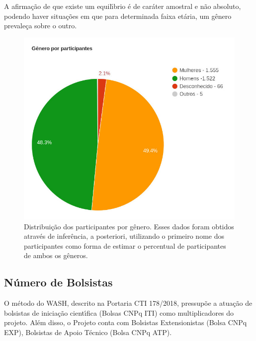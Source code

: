 \documentclass[
12pt,		%
openright,	%
twoside,  %
a4paper,			%
chapter=TITLE,		%
english,			%
french,				%
spanish,			%
brazil				%
]{USPSC-classe/USPSC_RedarTex}
\begin{document}
A afirma\c{c}\~ao de que existe um equil\'{\i}brio \'e de car\'ater amostral e n\~ao absoluto, podendo haver situa\c{c}\~oes em que para determinada faixa et\'aria, um g\^enero prevale\c{c}a sobre o outro.










\captionsetup{format=plain}
\begin{figure}[max size={\textwidth}]

\centering


\begin{minipage}[b]{0.4\linewidth}
        \centering
                \includegraphics[width=1.0\linewidth]{../../imagens/genero-todos-crop.jpeg}
                \caption{Distribui\c{c}\~ao dos participantes por g\^enero. Esses dados foram obtidos atrav\'es de infer\^encia, a posteriori, utilizando o primeiro nome dos participantes como forma de estimar o percentual de participantes de ambos os g\^eneros.}
                \label{ef11d820efb73d78fb64eb6bdd03853471a8e89f}
\end{minipage}%
\hspace{0.5cm}
\end{figure}



\subsection[N\'umero de Bolsistas]{N\'umero de Bolsistas}\label{N\'umero de Bolsistas}
O m\'etodo do WASH, descrito na Portaria CTI 178/2018, pressup\~oe a atua\c{c}\~ao de bolsistas de inicia\c{c}\~ao cient\'{\i}fica (Bolsas CNPq ITI) como multiplicadores do projeto. Al\'em disso, o Projeto conta com Bolsistas Extensionistas (Bolsa CNPq EXP), Bolsistas de Apoio T\'ecnico (Bolsa CNPq ATP).
\end{document}

